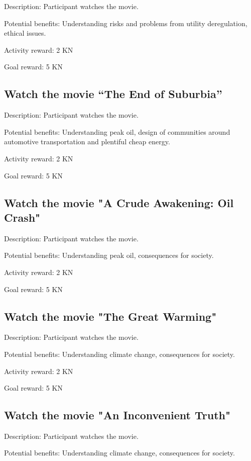 Description: Participant watches the movie.

Potential benefits: Understanding risks and problems from utility deregulation, ethical issues.

Activity reward: 2 KN

Goal reward: 5 KN

\subsection[Watch the movie ``The End of Suburbia'']{Watch the movie ``The End of Suburbia''}

Description: Participant watches the movie.

Potential benefits: Understanding peak oil, design of communities around automotive transportation and plentiful cheap energy.

Activity reward: 2 KN

Goal reward: 5 KN

\subsection{Watch the movie "A Crude Awakening: Oil Crash"}

Description: Participant watches the movie.

Potential benefits: Understanding peak oil, consequences for society.

Activity reward: 2 KN

Goal reward: 5 KN

\subsection{Watch the movie "The Great Warming"}

Description: Participant watches the movie.

Potential benefits: Understanding climate change, consequences for society.

Activity reward: 2 KN

Goal reward: 5 KN

\subsection{Watch the movie "An Inconvenient Truth"}

Description: Participant watches the movie.

Potential benefits: Understanding climate change, consequences for society.

